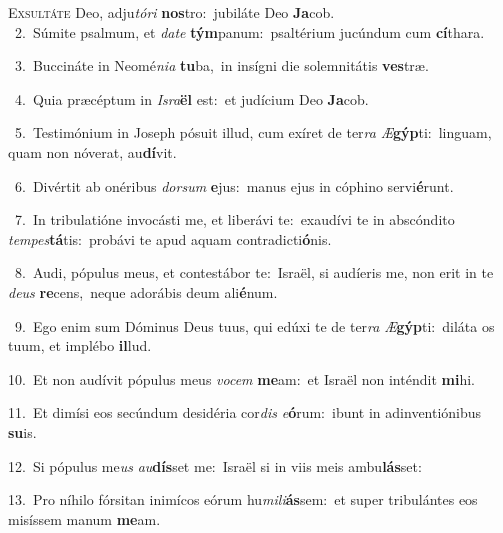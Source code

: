 \lettrine{\initial\textcolor{\initialcolor}{E}}{xsultáte} Deo, adju\-\textit{tó}\-\textit{ri} \textbf{nos}\-tro:~\star jubiláte Deo \textbf{Ja}\-cob.\\
{\numbfont\textcolor{\numbcolor}{~2.}}~Súmite psalmum, et \textit{da}\-\textit{te} \textbf{tým}\-panum:~\star psaltérium jucúndum cum \textbf{cí}\-thara.\par
{\numbfont\textcolor{\numbcolor}{~3.}}~Buccináte in Neomé\-\textit{ni}\-\textit{a} \textbf{tu}\-ba,~\star in insígni die solemnitátis \textbf{ves}\-træ.\par
{\numbfont\textcolor{\numbcolor}{~4.}}~Quia præcéptum in \textit{Is}\-\textit{ra}\textbf{ël} est:~\star et judícium Deo \textbf{Ja}\-cob.\par
{\numbfont\textcolor{\numbcolor}{~5.}}~Testimónium in Joseph pósuit illud, cum exíret de ter\textit{ra} \textit{Æ}\-\textbf{gýp}ti:~\star linguam, quam non nóverat, au\-\textbf{dí}\-vit.\par
{\numbfont\textcolor{\numbcolor}{~6.}}~Divértit ab onéribus \textit{dor}\-\textit{sum} \textbf{e}\-jus:~\star manus ejus in cóphino servi\-\textbf{é}\-runt.\par
{\numbfont\textcolor{\numbcolor}{~7.}}~In tribulatióne invocásti me, et liberávi te:~\dagger exaudívi te in abscóndito \textit{tem}\-\textit{pes}\textbf{tá}tis:~\star probávi te apud aquam contradicti\-\textbf{ó}\-nis.\par
{\numbfont\textcolor{\numbcolor}{~8.}}~Audi, pópulus meus, et contestábor te:~\dagger Israël, si audíeris me, non erit in te \textit{de}\-\textit{us} \textbf{re}\-cens,~\star neque adorábis deum ali\-\textbf{é}\-num.\par
{\numbfont\textcolor{\numbcolor}{~9.}}~Ego enim sum Dóminus Deus tuus, qui edúxi te de ter\textit{ra} \textit{Æ}\-\textbf{gýp}ti:~\star diláta os tuum, et implébo \textbf{il}\-lud.\par
{\numbfont\textcolor{\numbcolor}{10.}}~Et non audívit pópulus meus \textit{vo}\-\textit{cem} \textbf{me}\-am:~\star et Israël non inténdit \textbf{mi}\-hi.\par
{\numbfont\textcolor{\numbcolor}{11.}}~Et dimísi eos secúndum desidéria cor\textit{dis} \textit{e}\-\textbf{ó}rum:~\star ibunt in adinventiónibus \textbf{su}\-is.\par
{\numbfont\textcolor{\numbcolor}{12.}}~Si pópulus me\textit{us} \textit{au}\-\textbf{dís}set me:~\star Israël si in viis meis ambu\-\textbf{lás}\-set:\par
{\numbfont\textcolor{\numbcolor}{13.}}~Pro níhilo fórsitan inimícos eórum hu\-\textit{mi}\-\textit{li}\textbf{ás}sem:~\star et super tribulántes eos misíssem manum \textbf{me}\-am.\par
